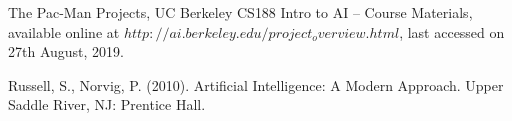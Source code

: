 \documentclass[
10pt, %
a4paper, %
oneside, %
headinclude,footinclude, %
BCOR5mm, %
]{scrartcl}
\begin{document}






\begin{thebibliography}{9}
	The Pac-Man Projects, UC Berkeley CS188 Intro to AI -- Course Materials,
	available online at \href{http://ai.berkeley.edu/project_overview.html}{$http://ai.berkeley.edu/project_overview.html$}, last accessed on 27th August, 2019.
	
	 Russell, S., Norvig, P. (2010). Artificial Intelligence: A Modern Approach. Upper Saddle River, NJ: Prentice Hall.
	
	
\end{thebibliography}
\end{document}
